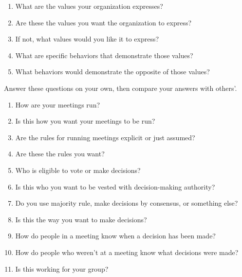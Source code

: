 \begin{enumerate}

\item
  What are the values your organization expresses?

\item
  Are these the values you want the organization to express?

\item
  If not, what values would you like it to express?

\item
  What are specific behaviors that demonstrate those values?

\item
  What behaviors would demonstrate the opposite of those values?
\end{enumerate}


Answer these questions on your own,
then compare your answers with others'.

\begin{enumerate}

\item
  How are your meetings run?

\item
  Is this how you want your meetings to be run?

\item
  Are the rules for running meetings explicit or just assumed?

\item
  Are these the rules you want?

\item
  Who is eligible to vote or make decisions?

\item
  Is this who you want to be vested with decision-making authority?

\item
  Do you use majority rule, make decisions by consensus, or something else?

\item
  Is this the way you want to make decisions?

\item
  How do people in a meeting know when a decision has been made?

\item
  How do people who weren't at a meeting know what decisions were made?

\item
  Is this working for your group?

\end{enumerate}

